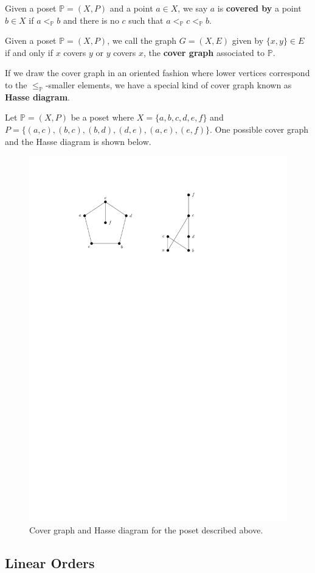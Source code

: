 \begin{definition}[Cover]
    Given a poset $\mathbb{P} = (X,P)$ and a point $a \in X$, we say $a$ is \textbf{covered by} a point $b \in X$ if $a <_{\mathbb{P}} b$ and there is no $c$ such that $a <_{\mathbb{P}} c <_{\mathbb{P}} b$.
\end{definition}

\begin{definition}
    Given a poset $\mathbb{P} = (X,P)$, we call the graph $G = (X,E)$ given by $\{x,y\} \in E$ if and only if $x$ covers $y$ or $y$ covers $x$, the \textbf{cover graph} associated to $\mathbb{P}$. 
\end{definition}

If we draw the cover graph in an oriented fashion where lower vertices correspond to the $\leq_{\mathbb{P}}$-smaller elements, we have a special kind of cover graph known as \textbf{Hasse diagram}.

Let $\mathbb{P} = (X,P)$ be a poset where $X = \{a,b,c,d,e,f\}$ and $P = \{ (a,c), (b,c), (b,d), (d,e), (a,e), (e,f)\}$. One possible cover graph and the Hasse diagram is shown below.

\begin{figure}[htbp]
    \centering
    \includegraphics[width=0.5\linewidth]{figures/hasse-diagram.pdf}
    \caption{Cover graph and Hasse diagram for the poset described above.}
    \label{fig:hasse-diagram-example}
\end{figure}

\subsection{Linear Orders}

